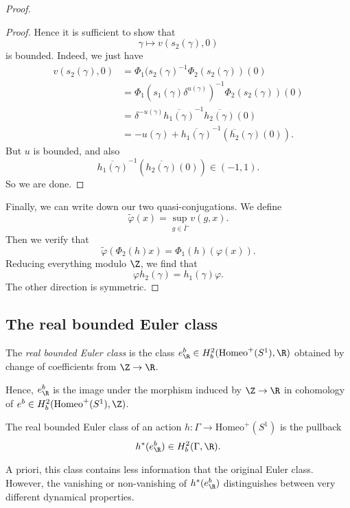 \documentclass[a4paper]{article}
\newcommand\Homeo{\mathrm{Homeo}}
\begin{document}
\begin{proof}
\begin{proof}
    Hence it is sufficient to show that
    \[
      \gamma \mapsto v(s_2(\gamma), 0)
    \]
    is bounded. Indeed, we just have
    \begin{align*}
      v(s_2(\gamma), 0) &= \Phi_1 (s_2(\gamma)^{-1} \Phi_2(s_2(\gamma))(0)\\
      &= \Phi_1(s_1(\gamma) \delta^{u(\gamma)})^{-1} \Phi_2(s_2(\gamma))(0)\\
      &= \delta^{-u(\gamma)} \overline{h_1(\gamma)}^{-1} \overline{h_2(\gamma)} (0)\\
      &= - u(\gamma) + \overline{h_1(\gamma)}^{-1} (\overline{h_2}(\gamma)(0)).
    \end{align*}
    But $u$ is bounded, and also
    \[
      \overline{h_1(\gamma)}^{-1} (\overline{h_2(\gamma)}(0)) \in (-1, 1).
    \]
    So we are done.
  \end{proof}
  Finally, we can write down our two quasi-conjugations. We define
  \[
    \tilde{\varphi}(x) = \sup_{g \in \bar{\Gamma}} v(g, x).
  \]
  Then we verify that
  \[
    \tilde{\varphi}(\Phi_2(h) x) = \Phi_1(h)(\varphi(x)).
  \]
  Reducing everything modulo $\Z$, we find that
  \[
    \varphi h_2(\gamma) = h_1(\gamma) \varphi.
  \]
  The other direction is symmetric.
\end{proof}

\subsection{The real bounded Euler class}
\begin{defi}
  The \emph{real bounded Euler class} is the class $e_\R^b \in H_b^2(\Homeo^+(S^1), \R)$ obtained by change of coefficients from $\Z \to \R$.
\end{defi}

Hence, $e^b_\R$ is the image under the morphism induced by $\Z \to \R$ in cohomology of $e^b \in H_b^2(\Homeo^+(S^1), \Z)$.

\begin{defi}
  The real bounded Euler class of an action $h: \Gamma \to \Homeo^+(S^1)$ is the pullback
  \[
    h^*(e_\R^b) \in H_b^2(\Gamma, \R).
  \]
\end{defi}

A priori, this class contains less information that the original Euler class. However, the vanishing or non-vanishing of $h^*(e^b_\R)$ distinguishes between very different dynamical properties.
\end{document}
